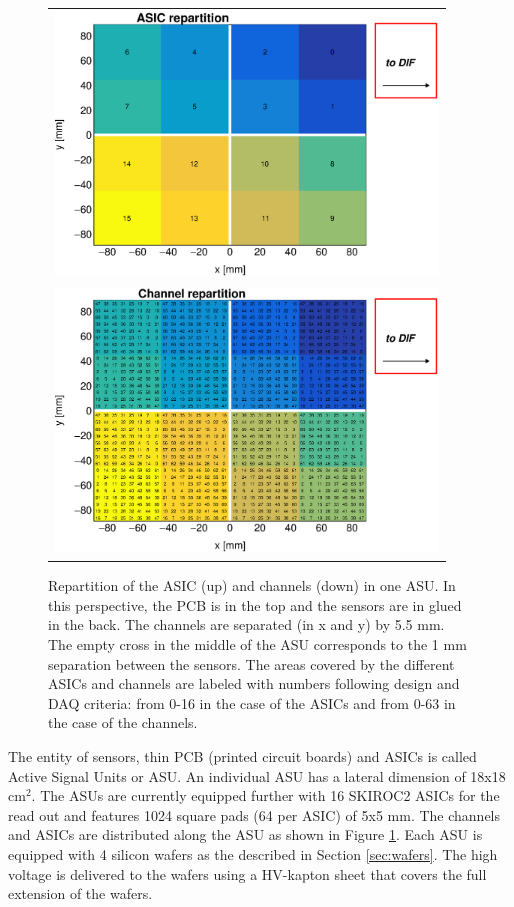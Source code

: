 \documentclass[a4paper,11pt]{article}
\begin{document}
\begin{figure}[!t]
  \centering
  \begin{tabular}{l}
    \includegraphics[width=4in]{../figs/ASU_geometry1.eps}  \\
    \includegraphics[width=4in]{../figs/ASU_geometry2.eps}  \\
  \end{tabular}
  \caption{Repartition of the ASIC (up) and channels (down) in one ASU. In this perspective, the PCB is in the top
    and the sensors are in glued in the back.
    The channels are separated (in x and y) by 5.5 mm.
    The empty cross in the middle of the ASU corresponds to the 1 mm separation between the sensors.
    The areas covered by the different ASICs and channels
    are labeled with numbers following design and DAQ criteria: from 0-16 in the case of the ASICs and from 0-63 in the case of the channels.
  }
\label{ASU}
\end{figure}

The entity
of sensors, thin PCB (printed circuit boards) and ASICs is called Active Signal Units or ASU.
An individual ASU has a lateral dimension of 18x18 cm$^{2}$.
The ASUs are currently equipped
further with 16 SKIROC2 ASICs for the read out and features 1024 square pads (64 per ASIC) of 5x5 mm.
The channels and ASICs are distributed along the ASU as shown in Figure \ref{ASU}. Each ASU is equipped with 4 silicon wafers as the described in Section \ref{sec:wafers}.
The high voltage is delivered to the wafers using a HV-kapton sheet that covers the full extension of the wafers.
\end{document}
